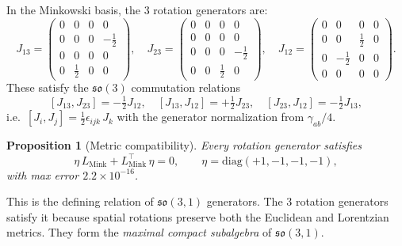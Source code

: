 \documentclass[11pt]{article}
\newtheorem{proposition}{Proposition}
\theoremstyle{definition}
\theoremstyle{remark}
\begin{document}
In the Minkowski basis, the 3 rotation generators are:
\begin{equation}\label{eq:rotations}
  J_{13} = \begin{pmatrix} 0&0&0&0\\0&0&0&-\tfrac12\\0&0&0&0\\0&\tfrac12&0&0 \end{pmatrix},
  \quad
  J_{23} = \begin{pmatrix} 0&0&0&0\\0&0&0&0\\0&0&0&-\tfrac12\\0&0&\tfrac12&0 \end{pmatrix},
  \quad
  J_{12} = \begin{pmatrix} 0&0&0&0\\0&0&\tfrac12&0\\0&-\tfrac12&0&0\\0&0&0&0 \end{pmatrix}.
\end{equation}
These satisfy the $\mathfrak{so}(3)$ commutation relations
\begin{equation}\label{eq:so3-comm}
  [J_{13}, J_{23}] = -\tfrac{1}{2} J_{12}, \quad
  [J_{13}, J_{12}] = +\tfrac{1}{2} J_{23}, \quad
  [J_{23}, J_{12}] = -\tfrac{1}{2} J_{13},
\end{equation}
i.e.\ $[J_i, J_j] = \tfrac{1}{2}\epsilon_{ijk}\, J_k$ with the
generator normalization from $\gamma_{ab}/4$.

\begin{proposition}[Metric compatibility]\label{prop:eta}
Every rotation generator satisfies
\begin{equation}\label{eq:eta-compat}
  \eta\, L_{\mathrm{Mink}} + L_{\mathrm{Mink}}^{\!\top}\, \eta = 0,
  \qquad \eta = \mathrm{diag}(+1,-1,-1,-1),
\end{equation}
with max error $2.2 \times 10^{-16}$.
\end{proposition}

\noindent This is the defining relation of $\mathfrak{so}(3,1)$
generators.  The 3 rotation generators satisfy it because
spatial rotations preserve both the Euclidean and Lorentzian metrics.
They form the \emph{maximal compact subalgebra} of $\mathfrak{so}(3,1)$.
\end{document}
